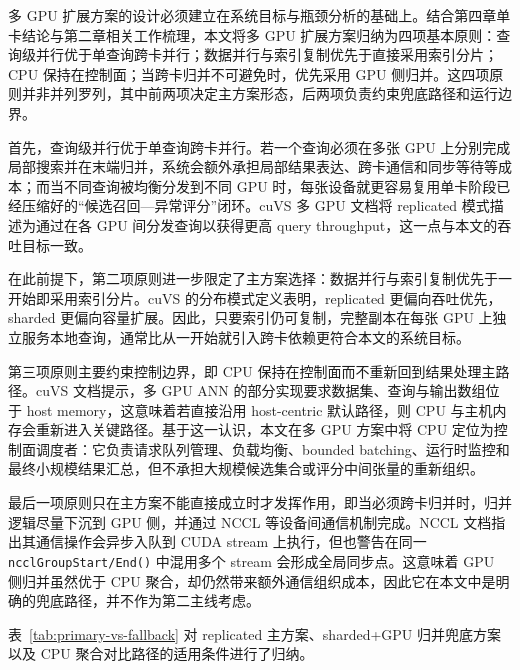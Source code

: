 多 GPU 扩展方案的设计必须建立在系统目标与瓶颈分析的基础上。结合第四章单卡结论与第二章相关工作梳理，本文将多 GPU 扩展方案归纳为四项基本原则：查询级并行优于单查询跨卡并行；数据并行与索引复制优先于直接采用索引分片；CPU 保持在控制面；当跨卡归并不可避免时，优先采用 GPU 侧归并。这四项原则并非并列罗列，其中前两项决定主方案形态，后两项负责约束兜底路径和运行边界。

首先，查询级并行优于单查询跨卡并行。若一个查询必须在多张 GPU 上分别完成局部搜索并在末端归并，系统会额外承担局部结果表达、跨卡通信和同步等待等成本；而当不同查询被均衡分发到不同 GPU 时，每张设备就更容易复用单卡阶段已经压缩好的``候选召回---异常评分''闭环。cuVS 多 GPU 文档将 replicated 模式描述为通过在各 GPU 间分发查询以获得更高 query throughput，这一点与本文的吞吐目标一致\citep{cuvs_multi_gpu_nn}。

在此前提下，第二项原则进一步限定了主方案选择：数据并行与索引复制优先于一开始即采用索引分片。cuVS 的分布模式定义表明，replicated 更偏向吞吐优先，sharded 更偏向容量扩展\citep{cuvs_multi_gpu_nn,cuvs_dist_mode}。因此，只要索引仍可复制，完整副本在每张 GPU 上独立服务本地查询，通常比从一开始就引入跨卡依赖更符合本文的系统目标。

第三项原则主要约束控制边界，即 CPU 保持在控制面而不重新回到结果处理主路径。cuVS 文档提示，多 GPU ANN 的部分实现要求数据集、查询与输出数组位于 host memory，这意味着若直接沿用 host-centric 默认路径，则 CPU 与主机内存会重新进入关键路径\citep{cuvs_multi_gpu_ivf_host}。基于这一认识，本文在多 GPU 方案中将 CPU 定位为控制面调度者：它负责请求队列管理、负载均衡、bounded batching、运行时监控和最终小规模结果汇总，但不承担大规模候选集合或评分中间张量的重新组织。

最后一项原则只在主方案不能直接成立时才发挥作用，即当必须跨卡归并时，归并逻辑尽量下沉到 GPU 侧，并通过 NCCL 等设备间通信机制完成。NCCL 文档指出其通信操作会异步入队到 CUDA stream 上执行，但也警告在同一 \texttt{ncclGroupStart/End()} 中混用多个 stream 会形成全局同步点\citep{nccl_stream_semantics}。这意味着 GPU 侧归并虽然优于 CPU 聚合，却仍然带来额外通信组织成本，因此它在本文中是明确的兜底路径，并不作为第二主线考虑。

表~\ref{tab:primary-vs-fallback} 对 replicated 主方案、sharded+GPU 归并兜底方案以及 CPU 聚合对比路径的适用条件进行了归纳。

